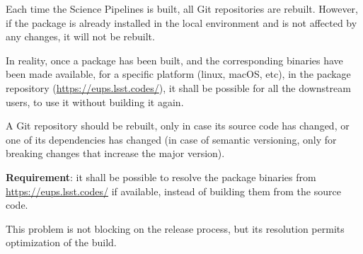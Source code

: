 Each time the Science Pipelines is built, all Git repositories are rebuilt. However, if the package is already installed in the local environment and is not affected by any changes, it will not be rebuilt.

In reality, once a package has been built, and the corresponding binaries have been made available, for a specific platform (linux, macOS, etc), in the package repository (\url{https://eups.lsst.codes/}),
it shall be possible for all the downstream users, to use it without building it again.

A Git repository should be rebuilt, only in case its source code has changed, or one of its dependencies has changed (in case of semantic versioning, only for breaking changes that increase the major version).

\textbf{Requirement}: it shall be possible to resolve the package binaries from \url{https://eups.lsst.codes/} if available, instead of building them from the source code.

This problem is not blocking on the release process, but its resolution permits optimization of the build.



